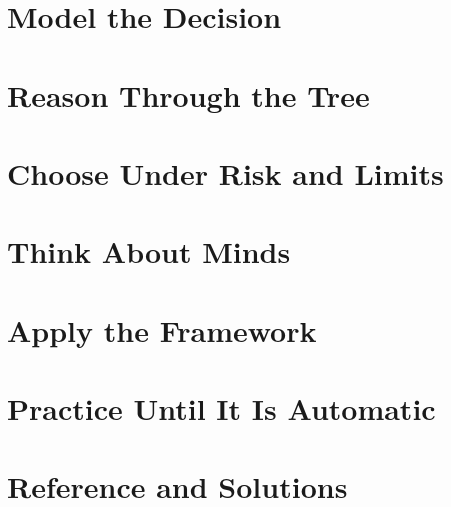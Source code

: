 \documentclass[11pt,openany,oneside]{book}
\renewcommand{\]}{\ifmmode\StrictDisplayClose\fi}%
\begin{document}
\frontmatter

\tableofcontents
\listoffigures
\listoftables

\mainmatter
\part{Model the Decision}


\part{Reason Through the Tree}


\part{Choose Under Risk and Limits}


\part{Think About Minds}


\part{Apply the Framework}


\part{Practice Until It Is Automatic}


\appendix
\part{Reference and Solutions}


\backmatter

\end{document}
